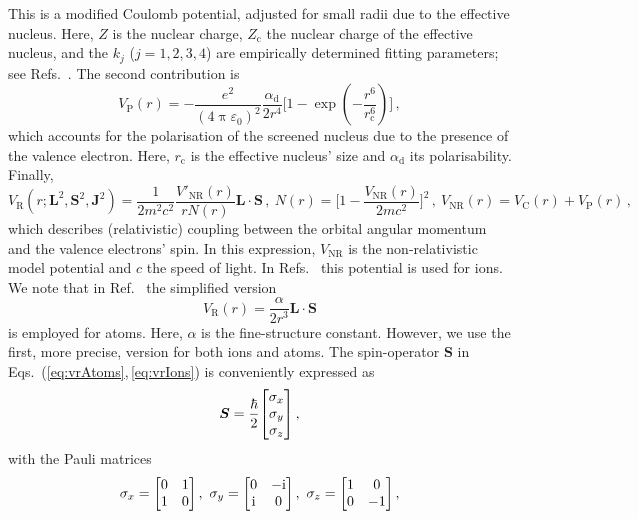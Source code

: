 \documentclass[fontsize=12pt,
               twoside=false,
               BCOR=0mm,
               DIV=14,
               overfullrule=true, %
               toc=bibliography,
               headinclude=true,
               footinclude=false]{scrartcl}
\numberwithin{equation}{section}
\newcommand{\ii}{\mathrm{i}}
\newcommand{\pii}{\uppi}
\begin{document}
    This is a modified Coulomb potential, adjusted for small radii due to the
    effective nucleus. Here, $Z$ is the nuclear charge, $Z_\mathrm{c}$ the
    nuclear charge of the effective nucleus, and the $k_j$ ($j=1,2,3,4$) are
    empirically determined fitting parameters; see
    Refs.~\cite{aymar1996,marinescu1994,wilkinson2025}. The second contribution
    is
    \begin{equation}
        V_\mathrm{P}(r)
        =
        -\frac{e^2}{(4\pii\varepsilon_0)^2}
        \frac{\alpha_\mathrm{d}}{2r^4}
        \bigg[1-\exp(-\frac{r^6}{r^6_\mathrm{c}})\bigg]
    \,,
    \end{equation}
    which accounts for the polarisation of the screened nucleus due to the
    presence of the valence electron. Here, $r_\mathrm{c}$ is the effective
    nucleus' size and $\alpha_\mathrm{d}$ its polarisability. Finally,
    \begin{equation}\label{eq:vrIons}
        V_\mathrm{R}(r;\bm{L}^2,\bm{S}^2,\bm{J}^2)
        =
        \frac{1}{2m^2c^2}\frac{V'_\mathrm{NR}(r)}{rN(r)}\bm{L}\cdot\bm{S}
    \,, \
        N(r) = \bigg[ 1 - \frac{V_\mathrm{NR}(r)}{2mc^2} \bigg]^2
    \,, \
        V_\mathrm{NR}(r) = V_\mathrm{C}(r) + V_\mathrm{P}(r)
    \,,
    \end{equation}
    which describes (relativistic) coupling between the orbital angular momentum
    and the valence electrons' spin. In this expression, $V_\mathrm{NR}$ is the
    non-relativistic model potential and $c$ the speed of light. In
    Refs.~\cite{wilkinson2025,aymar1996} this potential is used for ions. We
    note that in Ref.~\cite{sibalic2017} the simplified version
    \begin{equation}\label{eq:vrAtoms}
        V_\mathrm{R}(r)
        =
        \frac{\alpha}{2r^3} \bm{L}\cdot\bm{S}
    \end{equation}
    is employed for atoms. Here, $\alpha$ is the fine-structure constant.
    However, we use the first, more precise, version for both ions and atoms.
    The spin-operator $\bm{S}$ in Eqs.~(\ref{eq:vrAtoms},\,\ref{eq:vrIons}) is
    conveniently expressed as
    \begin{equation}
        \bm{S} = \frac{\hbar}{2}\mqty[\sigma_x \\ \sigma_y \\ \sigma_z]
    \,,
    \end{equation}
    with the Pauli matrices
    \begin{equation}
        \sigma_x = \mqty[0&1 \\ 1&0]
    \,, \
        \sigma_y = \mqty[0&-\ii \\ \ii&0]
    \,, \
        \sigma_z = \mqty[1&0 \\ 0&-1]
    \,,
    \end{equation}
\end{document}
